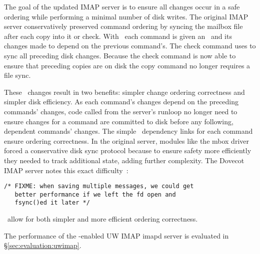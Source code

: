 The goal of the updated IMAP server is to ensure all changes occur in
a safe ordering while performing a minimal number of disk writes.  The
original IMAP server conservatively preserved command ordering by
syncing the mailbox file after each copy into it or check. With
\opgroups\, each command is given an \opgroup\ and its changes made to
depend on the previous command's. The check command uses \opgroupSync
to sync all preceding disk changes. Because the check command is now
able to ensure that preceding copies are on disk the copy command no
longer requires a file sync.

These \opgroup\ changes result in two benefits: simpler change
ordering correctness and simpler disk efficiency. As each command's
changes depend on the preceding commands' changes, code called from
the server's runloop no longer need to ensure changes for a command
are committed to disk before any following, dependent commands'
changes. The simple \opgroup\ dependency links for each command ensure
ordering correctness. In the original server, modules like the mbox
driver forced a conservative disk sync protocol because to ensure
safety more efficiently they needed to track additional state, adding
further complexity. The Dovecot IMAP server notes this exact
difficulty~\cite[maildir-save.c]{dovecot}:

\vspace{-0.5\baselineskip}
\begin{scriptsize}
\begin{verbatim}
/* FIXME: when saving multiple messages, we could get
   better performance if we left the fd open and
   fsync()ed it later */
\end{verbatim}
\end{scriptsize}

\vspace{-0.5\baselineskip}
\noindent \Opgroups\ allow for both simpler and more efficient ordering correctness.

The performance of the \opgroup{}-enabled UW IMAP imapd server is
evaluated in \S\ref{sec:evaluation:uwimap}.
